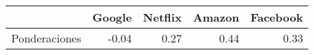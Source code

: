 \begin{table}[ht]
\centering
\begin{tabular}{rrrrr}
  \hline
 & Google & Netflix & Amazon & Facebook \\ 
  \hline
Ponderaciones & -0.04 & 0.27 & 0.44 & 0.33 \\ 
   \hline
\end{tabular}
\end{table}
